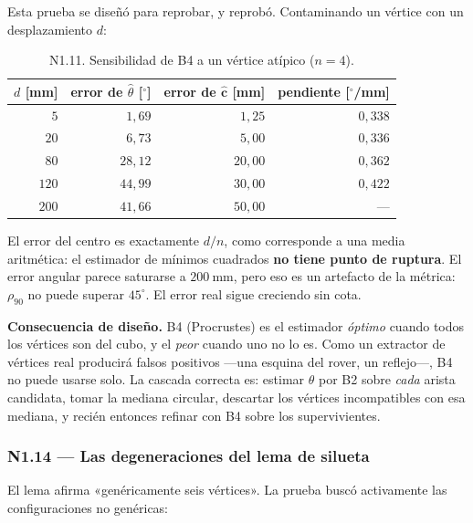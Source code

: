 \documentclass[11pt,a4paper]{article}
\newcommand{\grados}{^{\circ}}
\begin{document}
Esta prueba se diseñó para reprobar, y reprobó. Contaminando un vértice con un
desplazamiento $d$:

\begin{table}[htbp]
\centering
\small
\caption{N1.11. Sensibilidad de B4 a un vértice atípico ($n=4$).}
\begin{tabular}{rrrr}
\toprule
$d$ [mm] & error de $\hat\theta$ [$\grados$] & error de $\hat{\mathbf c}$ [mm] & pendiente [$\grados$/mm] \\
\midrule
$5$ & $1{,}69$ & $1{,}25$ & $0{,}338$ \\
$20$ & $6{,}73$ & $5{,}00$ & $0{,}336$ \\
$80$ & $28{,}12$ & $20{,}00$ & $0{,}362$ \\
$120$ & $44{,}99$ & $30{,}00$ & $0{,}422$ \\
$200$ & $41{,}66$ & $50{,}00$ & --- \\
\bottomrule
\end{tabular}
\end{table}

El error del centro es exactamente $d/n$, como corresponde a una media aritmética: el
estimador de mínimos cuadrados \textbf{no tiene punto de ruptura}. El error angular
parece saturarse a $200\ \mathrm{mm}$, pero eso es un artefacto de la métrica: $\rho_{90}$
no puede superar $45\grados$. El error real sigue creciendo sin cota.

\begin{tcolorbox}[colback=black!3,colframe=black!50,boxrule=0.5pt,arc=1pt]
\textbf{Consecuencia de diseño.} B4 (Procrustes) es el estimador \emph{óptimo} cuando
todos los vértices son del cubo, y el \emph{peor} cuando uno no lo es. Como un extractor
de vértices real producirá falsos positivos ---una esquina del rover, un reflejo---,
B4 no puede usarse solo. La cascada correcta es: estimar $\theta$ por B2 sobre
\emph{cada} arista candidata, tomar la mediana circular, descartar los vértices
incompatibles con esa mediana, y recién entonces refinar con B4 sobre los
supervivientes.
\end{tcolorbox}

\subsubsection{N1.14 --- Las degeneraciones del lema de silueta}

El lema afirma «genéricamente seis vértices». La prueba buscó activamente las
configuraciones no genéricas:
\end{document}
